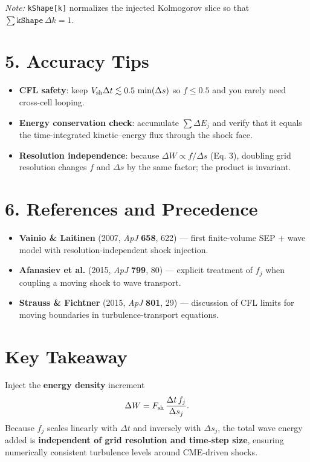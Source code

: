 \noindent
\textit{Note:} \texttt{kShape[k]} normalizes the injected Kolmogorov slice so that $\sum \texttt{kShape} \,\Delta k = 1$.

\section*{5. Accuracy Tips}

\begin{itemize}
\item \textbf{CFL safety}: keep $V_{\rm sh} \Delta t \lesssim 0.5\,\min(\Delta s)$ so $f \leq 0.5$ and you rarely need cross-cell looping.
\item \textbf{Energy conservation check}: accumulate $\sum \Delta E_j$ and verify that it equals the time-integrated kinetic–energy flux through the shock face.
\item \textbf{Resolution independence}: because $\Delta W \propto f / \Delta s$ (Eq. 3), doubling grid resolution changes $f$ and $\Delta s$ by the same factor; the product is invariant.
\end{itemize}

\section*{6. References and Precedence}

\begin{itemize}
\item \textbf{Vainio \& Laitinen} (2007, \textit{ApJ} \textbf{658}, 622) — first finite-volume SEP + wave model with resolution-independent shock injection.
\item \textbf{Afanasiev et al.} (2015, \textit{ApJ} \textbf{799}, 80) — explicit treatment of $f_j$ when coupling a moving shock to wave transport.
\item \textbf{Strauss \& Fichtner} (2015, \textit{ApJ} \textbf{801}, 29) — discussion of CFL limits for moving boundaries in turbulence-transport equations.
\end{itemize}

\section*{Key Takeaway}

Inject the \textbf{energy density} increment
\[
\Delta W = F_{\rm sh}\,\frac{\Delta t\,f_j}{\Delta s_j}.
\]
Because $f_j$ scales linearly with $\Delta t$ and inversely with $\Delta s_j$, the total wave energy added is \textbf{independent of grid resolution and time-step size}, ensuring numerically consistent turbulence levels around CME-driven shocks.




